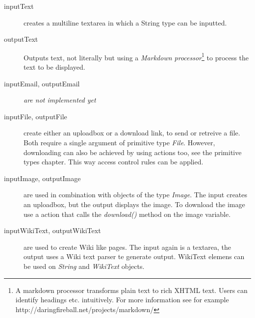 \begin{description}
	\item[inputText] creates a multiline textarea in which a String type can be inputted. 
	\item[outputText]Outputs text, not literally but using a \emph{Markdown processor}\footnote{A markdown processor transforms plain text to rich XHTML text. Users can identify headings etc. intuitively. For more information see for example http://daringfireball.net/projects/markdown/} to process the text to be displayed. 
	\item[inputEmail, outputEmail] \emph{are not implemented yet}
	\item[inputFile, outputFile]create either an uploadbox or a download link, to send or retreive a file. Both require a single argument of primitive type \emph{File}. However, downloading can also be achieved by using actions too, see the primitive types chapter. This way access control rules can be applied. 
	\item[inputImage, outputImage] are used in combination with objects of the type \emph{Image}. The input creates an uploadbox, but the output displays the image. To download the image use a action that calls the \emph{download()} method on the image variable. 
	\item[inputWikiText, outputWikiText] are used to create Wiki like pages. The input again is a textarea, the output uses a Wiki text parser te generate output. WikiText elemens can be used on \emph{String} and \emph{WikiText} objects. 
\end{description}

